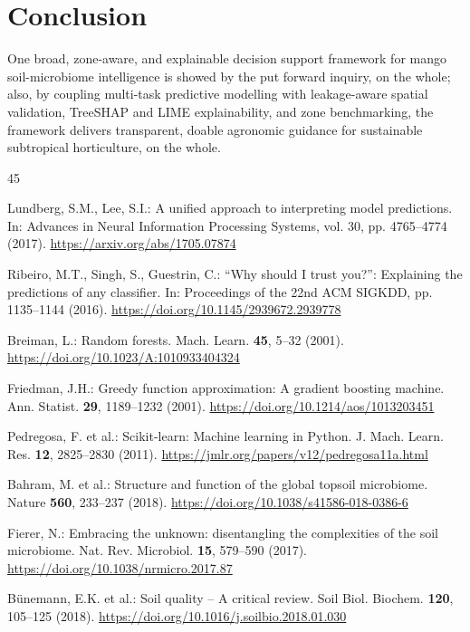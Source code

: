 \documentclass[runningheads,a4paper,oribibl]{llncs}
\begin{document}
\section{Conclusion}

One broad, zone-aware, and explainable decision support framework for mango soil-microbiome intelligence is showed by the put forward inquiry, on the whole; also, by coupling multi-task predictive modelling with leakage-aware spatial validation, TreeSHAP and LIME explainability, and zone benchmarking, the framework delivers transparent, doable agronomic guidance for sustainable subtropical horticulture, on the whole.


\begin{thebibliography}{45}

Lundberg, S.M., Lee, S.I.: A unified approach to interpreting model predictions. In: Advances in Neural Information Processing Systems, vol. 30, pp. 4765--4774 (2017). \url{https://arxiv.org/abs/1705.07874}

Ribeiro, M.T., Singh, S., Guestrin, C.: ``Why should I trust you?'': Explaining the predictions of any classifier. In: Proceedings of the 22nd ACM SIGKDD, pp. 1135--1144 (2016). \url{https://doi.org/10.1145/2939672.2939778}

Breiman, L.: Random forests. Mach. Learn. \textbf{45}, 5--32 (2001). \url{https://doi.org/10.1023/A:1010933404324}

Friedman, J.H.: Greedy function approximation: A gradient boosting machine. Ann. Statist. \textbf{29}, 1189--1232 (2001). \url{https://doi.org/10.1214/aos/1013203451}

Pedregosa, F. et al.: Scikit-learn: Machine learning in Python. J. Mach. Learn. Res. \textbf{12}, 2825--2830 (2011). \url{https://jmlr.org/papers/v12/pedregosa11a.html}

Bahram, M. et al.: Structure and function of the global topsoil microbiome. Nature \textbf{560}, 233--237 (2018). \url{https://doi.org/10.1038/s41586-018-0386-6}

Fierer, N.: Embracing the unknown: disentangling the complexities of the soil microbiome. Nat. Rev. Microbiol. \textbf{15}, 579--590 (2017). \url{https://doi.org/10.1038/nrmicro.2017.87}

Bünemann, E.K. et al.: Soil quality -- A critical review. Soil Biol. Biochem. \textbf{120}, 105--125 (2018). \url{https://doi.org/10.1016/j.soilbio.2018.01.030}


\end{thebibliography}
\end{document}
